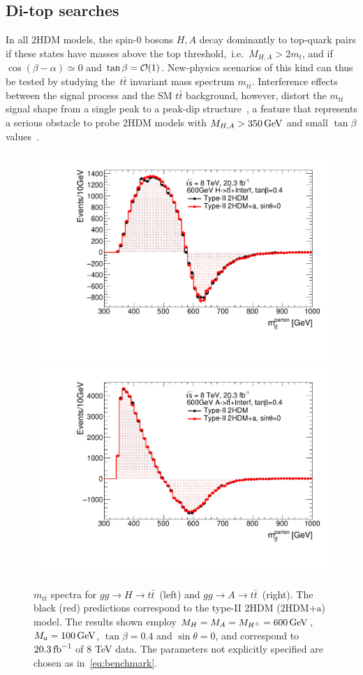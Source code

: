 \documentclass[a4paper, 11pt,notoc]{article}
\newcommand{\mA}{\ensuremath{M_{A}}\xspace}
\newcommand{\ma}{\ensuremath{M_{a}}\xspace}
\newcommand{\mH}{\ensuremath{M_{H}}\xspace}
\newcommand{\mHc}{\ensuremath{M_{H^{\pm}}}\xspace}
\newcommand{\hdma}{\ensuremath{\textrm{2HDM+a}}\xspace}
\begin{document}
\subsection{Di-top  searches}
\label{sec:ttbarresonances}

 In all 2HDM models, the spin-0 bosons $H,A$  decay dominantly to top-quark pairs if these states have masses above the top threshold,~i.e.~$M_{H, A} > 2 m_t$, and if $\cos (\beta - \alpha) \simeq 0$ and $\tan \beta = {\cal O}(1)$. New-physics scenarios of this kind can thus be tested by studying the~$t \bar t$ invariant mass spectrum $m_{t \bar t}$.  Interference effects between the signal process and the SM  $t \bar t$ background, however,  distort the $m_{t \bar t}$ signal shape from a single peak to a peak-dip structure~\cite{Gaemers:1984sj,Dicus:1994bm,Bernreuther:1997gs,Frederix:2007gi,Hespel:2016qaf,BuarqueFranzosi:2017jrj}, a feature that represents a serious obstacle to probe 2HDM models with $M_{H,A} > 350 \, {\rm GeV}$ and small $\tan \beta$ values~\cite{Craig:2015jba,Hajer:2015gka,Gori:2016zto,Carena:2016npr}. 

\begin{figure}
\centering
\includegraphics[width=.475\textwidth]{ttres_2HDMvs2HDMa_H.pdf} \quad 
\includegraphics[width=.475\textwidth]{ttres_2HDMvs2HDMa_A.pdf}
\vspace{4mm}
\caption{$m_{t \bar t}$ spectra for $gg \to H \to t \bar t$~(left) and  $gg \to A \to t \bar t$~(right). The black (red) predictions correspond to the type-II 2HDM (\hdma) model.  The  results shown employ $\mH=\mA=\mHc = 600 \, {\rm GeV}$,  $\ma=100 \, {\rm GeV}$, $\tan \beta =0.4$ and $\sin \theta = 0$, and correspond to $20.3 \, {\rm fb}^{-1}$ of 8 TeV data.  The parameters not explicitly specified are chosen as in~\eqref{eq:benchmark}.}
\label{fig:ttres_2HDMvs2HDMa}
\end{figure}
\end{document}

